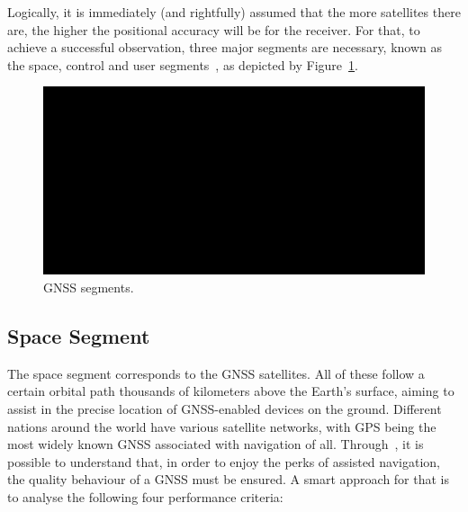 Logically, it is immediately (and rightfully) assumed that the more satellites there are, the higher the positional accuracy will be for the receiver. For that, to achieve a successful observation, three major segments are necessary, known as the space, control and user segments~\cite{gps_USGov,novatel_gnss,ayers_geosystems_2011}, as depicted by Figure~\ref{fig:s_c_u_segment}.

\begin{figure}[ht]
	\centering
	\includegraphics[width=1.0\textwidth]{Chapters/Figures/demo.png}
	\caption{GNSS segments.}
	\label{fig:s_c_u_segment}
\end{figure}

\subsection{Space Segment}\label{sec:II_gnss_space_seg}

The space segment corresponds to the GNSS satellites. All of these follow a certain orbital path thousands of kilometers above the Earth's surface, aiming to assist in the precise location of GNSS-enabled devices on the ground.
Different nations around the world have various satellite networks, with GPS being the most widely known GNSS associated with navigation of all.
Through~\cite{fed_rad_plan_2008}, it is possible to understand that, in order to enjoy the perks of assisted navigation, the quality behaviour of a GNSS must be ensured. 
A smart approach for that is to analyse the following four performance criteria:

